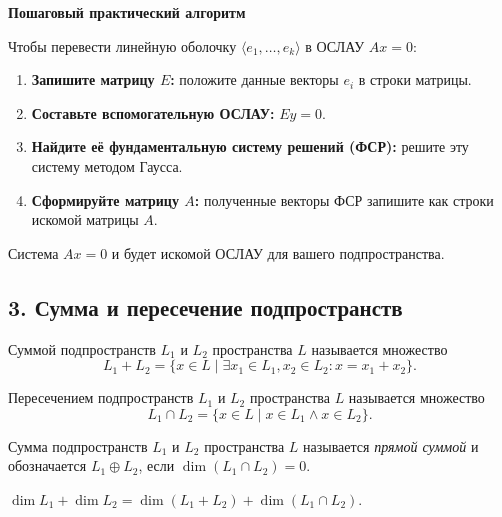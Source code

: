 \noindent\textbf{Пошаговый практический алгоритм}

Чтобы перевести линейную оболочку $\langle e_1, \dots, e_k \rangle$ в ОСЛАУ $Ax = 0$:

\begin{enumerate}
    \item \textbf{Запишите матрицу $E$:} положите данные векторы $e_i$ в строки матрицы.
    \item \textbf{Составьте вспомогательную ОСЛАУ:} $Ey = 0$.
    \item \textbf{Найдите её фундаментальную систему решений (ФСР):} решите эту систему методом Гаусса.
    \item \textbf{Сформируйте матрицу $A$:} полученные векторы ФСР запишите как строки искомой матрицы $A$.
\end{enumerate}

Система $Ax = 0$ и будет искомой ОСЛАУ для вашего подпространства.


\subsection*{3. Сумма и пересечение подпространств}

\begin{definition} Суммой подпространств $L_1$ и $L_2$ пространства $L$ называется множество
$$L_1 + L_2 = \{x \in L \mid \exists x_1 \in L_1, x_2 \in L_2 : x = x_1 + x_2\}.$$
\end{definition}

\begin{definition} Пересечением подпространств $L_1$ и $L_2$ пространства $L$ называется множество
$$L_1 \cap L_2 = \{x \in L \mid x \in L_1 \wedge x \in L_2\}.$$
\end{definition}

\begin{definition} Сумма подпространств $L_1$ и $L_2$ пространства $L$ называется \textit{прямой суммой} и обозначается $L_1 \oplus L_2$, если $\dim(L_1 \cap L_2) = 0$.
\end{definition}

\begin{theorem}
$\dim L_1 + \dim L_2 = \dim(L_1 + L_2) + \dim(L_1 \cap L_2)$.
\end{theorem}
